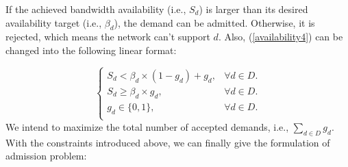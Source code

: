 \documentclass[sigconf]{acmart}
\begin{document}
\begin{appendices}
If the achieved bandwidth  availability (i.e., $S_d$) is larger than its desired availability target (i.e., $\beta_d$), the demand can be admitted.
Otherwise, it is rejected, which means the network can't support $d$.
Also,  (\ref{availability4}) can be changed into the following linear format:

\begin{equation}
\begin{cases}
S_d <  \beta_{d}\times  (1-g_d)+g_d,& \forall d \in D. \\
S_d \ge  \beta_{d} \times g_d,& \forall d \in D. \\
g_d\in\{0,1\},& \forall d \in D. \\
\end{cases}
\label{g-2}
\end{equation}
We intend to maximize the total number of accepted demands, i.e., $ \sum_{d\in D} g_d$.
With the constraints introduced above, we can finally give the formulation of admission problem:


\end{appendices}
\end{document}
